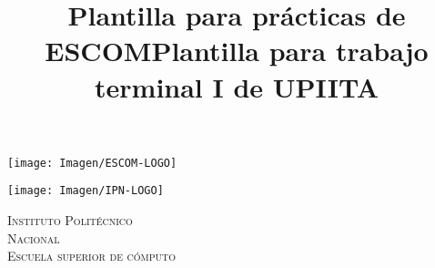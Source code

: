 \documentclass[10pt]{article}
\title{Plantilla para prácticas de ESCOM}
\title{Plantilla para trabajo terminal I de UPIITA}
\begin{document}
\begin{center}                                                                      %
\newcommand{\HRule}{\rule{\linewidth}{0.5mm}}                                   %
\begin{minipage}{0.48\textwidth} \begin{flushleft}
\texttt{[image: Imagen/ESCOM-LOGO]}
\end{flushleft}\end{minipage}
\begin{minipage}{0.48\textwidth} \begin{flushright}
\texttt{[image: Imagen/IPN-LOGO]}
\end{flushright}\end{minipage}

\vspace*{-1.5cm}                                %
\textsc{\huge Instituto Polit\'ecnico\\ \vspace{5px} Nacional}\\[1.5cm] 

\textsc{\LARGE Escuela superior de c\'omputo}\\[1.5cm]                                                   %


\end{center}
\end{document}
